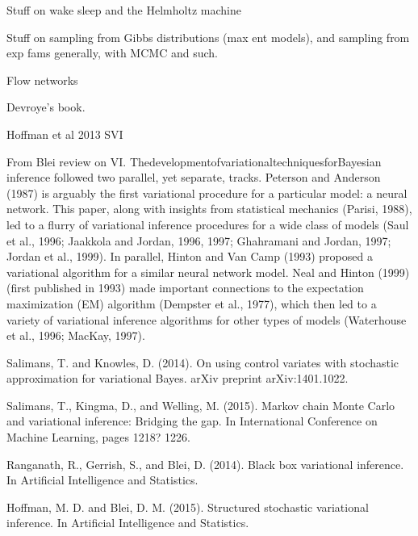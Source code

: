 \documentclass{article}
\begin{document}



Stuff on wake sleep and the Helmholtz machine

Stuff on sampling from Gibbs distributions (max ent models), and sampling from exp fams generally, with MCMC and such.

Flow networks

Devroye's book.

Hoffman et al 2013 SVI 


From Blei review on VI.
ThedevelopmentofvariationaltechniquesforBayesian inference followed two parallel, yet separate, tracks. Peterson and Anderson (1987) is arguably the first variational procedure for a particular model: a neural network. This paper, along with insights from statistical mechanics (Parisi, 1988), led to a flurry of variational inference procedures for a wide class of models (Saul et al., 1996; Jaakkola and Jordan, 1996, 1997; Ghahramani and Jordan, 1997; Jordan et al., 1999). In parallel, Hinton and Van Camp (1993) proposed a variational algorithm for a similar neural network model. Neal and Hinton (1999) (first published in 1993) made important connections to the expectation maximization (EM) algorithm (Dempster et al., 1977), which then led to a variety of variational inference algorithms for other types of models (Waterhouse et al., 1996; MacKay, 1997).

Salimans, T. and Knowles, D. (2014). On using control variates with stochastic approximation for variational Bayes. arXiv preprint arXiv:1401.1022.

Salimans, T., Kingma, D., and Welling, M. (2015). Markov chain Monte Carlo and variational inference: Bridging the gap. In International Conference on Machine Learning, pages 1218? 1226.

Ranganath, R., Gerrish, S., and Blei, D. (2014). Black box variational inference. In Artificial
Intelligence and Statistics.

Hoffman, M. D. and Blei, D. M. (2015). Structured stochastic variational inference. In Artificial Intelligence and Statistics.
\end{document}
